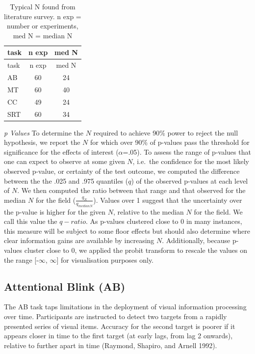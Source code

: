 \documentclass{article}
\begin{document}
\begin{longtable}[]{@{}lcc@{}}
\caption{\label{tab:survey}Typical N found from literature survey. n exp = number or experiments, med N = median N}\tabularnewline
\toprule
task & n exp & med N \\
\midrule
\endfirsthead
\toprule
task & n exp & med N \\
\midrule
\endhead
AB & 60 & 24 \\
MT & 60 & 40 \\
CC & 49 & 24 \\
SRT & 60 & 34 \\
\bottomrule
\end{longtable}

\emph{p Values}
To determine the \(N\) required to achieve 90\% power to reject the null hypothesis, we report the \(N\) for which over 90\% of p-values pass the threshold for significance for the effects of interest (\(\alpha\)=.05). To assess the range of p-values that one can expect to observe at some given \(N\), i.e.~the confidence for the most likely observed p-value, or certainty of the test outcome, we computed the difference between the the .025 and .975 quantiles (\(q\)) of the observed p-values at each level of \(N\). We then computed the ratio between that range and that observed for the median \(N\) for the field (\(\frac{q_{N}}{q_{medianN}}\)). Values over 1 suggest that the uncertainty over the p-value is higher for the given \(N\), relative to the median \(N\) for the field. We call this value the \(q-ratio\). As p-values clustered close to 0 in many instances, this measure will be subject to some floor effects but should also determine where clear information gains are available by increasing \(N\). Additionally, because p-values cluster close to 0, we applied the probit transform to rescale the values on the range {[}-\(\infty\), \(\infty\){]} for visualisation purposes only.

\hypertarget{attentional-blink-ab}{%
\subsection{Attentional Blink (AB)}\label{attentional-blink-ab}}

\label{sec:ABMeth}

The AB task taps limitations in the deployment of visual information processing over time. Participants are instructed to detect two targets from a rapidly presented series of visual items. Accuracy for the second target is poorer if it appears closer in time to the first target (at early lags, from lag 2 onwards), relative to further apart in time (Raymond, Shapiro, and Arnell 1992).
\end{document}
